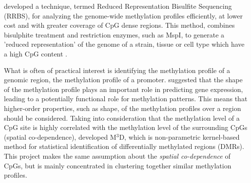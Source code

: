 \cite{Meissner2005} developed a technique, termed Reduced Representation Bisulfite Sequencing (RRBS), for analyzing the genome-wide methylation profiles efficiently, at lower cost and with greater coverage of CpG dense regions. This method, combines bisulphite treatment and restriction enzymes, such as MspI, to generate a 'reduced representation' of the genome of a strain, tissue or cell type which have a high CpG content \citep{Meissner2005}. 

What is often of practical interest is identifying the methylation profile of a genomic region, \eg the methylation profile of a promoter. \cite{Vanderkraats2013} suggested that the shape of the methylation profile plays an important role in predicting gene expression, leading to a potentially functional role for methylation patterns. This means that higher-order properties, such as shape, of the methylation profiles over a region should be considered. Taking into consideration that the methylation level of a CpG site is highly correlated with the methylation level of the surrounding CpGs (\ie spatial co-dependence), \cite{Mayo2014} developed M$^3$D, which is non-parametric kernel-based method for statistical identification of differentially methylated regions (DMRs). This project makes the same assumption about the \emph{spatial co-dependence} of CpGs, but is mainly concentrated in clustering together similar methylation profiles.